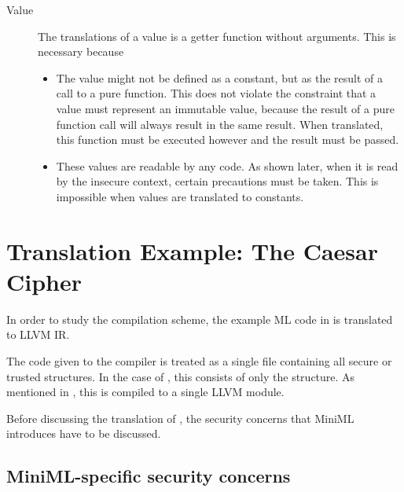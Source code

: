 \begin{description}

\item[Value]
The translations of a value is a getter function without arguments.
This is necessary because \begin{itemize}
 \item The value might not be defined as a constant, but as the result of a call to a pure function.
 This does not violate the constraint that a value must represent an immutable value, because the result of a pure function call will always result in the same result. 
When translated, this function must be executed however and the result must be passed.
\item These values are readable by any code.
As shown later, when it is read by the insecure context, certain precautions must be taken.
This is impossible when values are translated to constants.
 \end{itemize}


\end{description}

\section{Translation Example: The Caesar Cipher}
\label{sec:translationexample}
In order to study the compilation scheme, the example ML code in  is translated to LLVM IR.

The code given to the compiler is treated as a single file containing all secure or trusted structures.
In the case of , this consists of only the  structure.
As mentioned in , this is compiled to a single LLVM module.

Before discussing the translation of , the security concerns that MiniML introduces have to be discussed.

\subsection{MiniML-specific security concerns}
\label{sec:securityconcerns}

